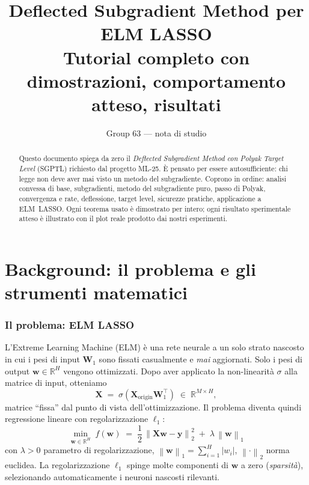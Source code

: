 \documentclass[11pt,a4paper]{article}
\title{\textbf{Deflected Subgradient Method per ELM LASSO} \\[0.4em]
\large Tutorial completo con dimostrazioni, comportamento atteso, risultati}
\author{Group 63 --- nota di studio}
\date{}
\newcommand{\R}{\mathbb{R}}
\newcommand{\norm}[1]{\left\|#1\right\|}
\newcommand{\bw}{\mathbf{w}}
\newcommand{\by}{\mathbf{y}}
\newcommand{\bX}{\mathbf{X}}
\newcommand{\bW}{\mathbf{W}}
\theoremstyle{definition}
\begin{document}
\maketitle

\begin{abstract}
\noindent Questo documento spiega da zero il \emph{Deflected Subgradient Method con Polyak Target Level} (SGPTL) richiesto dal progetto ML-25. È pensato per essere autosufficiente: chi legge non deve aver mai visto un metodo del subgradiente. Coprono in ordine: analisi convessa di base, subgradienti, metodo del subgradiente puro, passo di Polyak, convergenza e rate, deflessione, target level, sicurezze pratiche, applicazione a ELM~LASSO. Ogni teorema usato è dimostrato per intero; ogni risultato sperimentale atteso è illustrato con il plot reale prodotto dai nostri esperimenti.
\end{abstract}

\tableofcontents
\vspace{1em}

\part{Background: il problema e gli strumenti matematici}

\section{Il problema: ELM LASSO}
\label{sec:setup}

L'Extreme Learning Machine (ELM) è una rete neurale a un solo strato nascosto in cui i pesi di input $\bW_1$ sono fissati casualmente e \emph{mai} aggiornati. Solo i pesi di output $\bw\in\R^H$ vengono ottimizzati. Dopo aver applicato la non-linearità $\sigma$ alla matrice di input, otteniamo
\[
\bX \;=\; \sigma(\bX_{\text{origin}}\bW_1^\top) \;\in\;\R^{M\times H},
\]
matrice ``fissa'' dal punto di vista dell'ottimizzazione. Il problema diventa quindi regressione lineare con regolarizzazione $\ell_1$:
\begin{equation}
\label{eq:lasso}
\boxed{\;\;
\min_{\bw\in\R^H}\;
f(\bw) \;=\; \frac{1}{2}\,\norm{\bX\bw-\by}_2^2 \;+\; \lambda\,\norm{\bw}_1
\;\;}
\end{equation}
con $\lambda>0$ parametro di regolarizzazione, $\norm{\bw}_1 = \sum_{i=1}^H |w_i|$, $\norm{\cdot}_2$ norma euclidea. La regolarizzazione $\ell_1$ spinge molte componenti di $\bw$ a zero (\emph{sparsità}), selezionando automaticamente i neuroni nascosti rilevanti.
\end{document}
